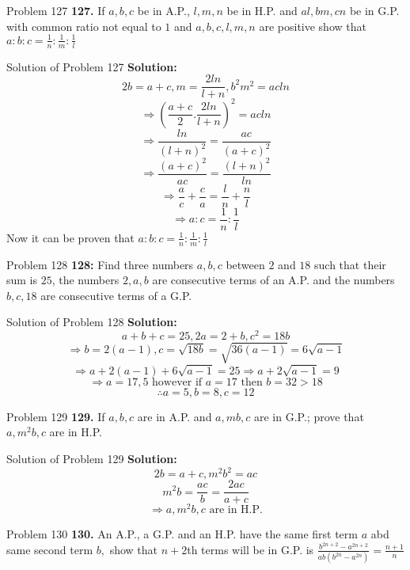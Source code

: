 \documentclass[aspectratio=1610,8pt]{beamer}
\begin{document}
\begin{frame}{Problem 127}
  \textbf{127.} If $a, b, c$ be in A.P., $l, m, n$ be in H.P. and $al, bm, cn$ be in G.P. with common ratio not equal to $1$ and
  $a, b, c, l, m, n$ are positive show that $a:b:c = \frac{1}{n}:\frac{1}{m}:\frac{1}{l}$
\end{frame}
\begin{frame}{Solution of Problem 127}
  \textbf{Solution:} $$2b = a + c, m = \frac{2ln}{l + n}, b^2m^2 = acln$$
  $$\Rightarrow \left(\frac{a + c}{2}.\frac{2ln}{l + n}\right)^2 = acln$$
  $$\Rightarrow \frac{ln}{(l + n)^2} = \frac{ac}{(a + c)^2}$$
  $$\Rightarrow \frac{(a + c)^2}{ac} = \frac{(l + n)^2}{ln}$$
  $$\Rightarrow \frac{a}{c} + \frac{c}{a} = \frac{l}{n} + \frac{n}{l}$$
  $$\Rightarrow a:c = \frac{1}{n}:\frac{1}{l}$$
  Now it can be proven that $a:b:c = \frac{1}{n}:\frac{1}{m}:\frac{1}{l}$
\end{frame}
\begin{frame}{Problem 128}
  \textbf{128:} Find three numbers $a, b, c$ between $2$ and $18$ such that their sum is $25$, the numbers $2, a, b$ are
  consecutive terms of an A.P. and the numbers $b, c, 18$ are consecutive terms of a G.P.
\end{frame}
\begin{frame}{Solution of Problem 128}
  \textbf{Solution:} $$a + b + c = 25, 2a = 2 + b, c^2 = 18b$$
  $$\Rightarrow b = 2(a - 1), c = \sqrt{18b} = \sqrt{36(a - 1)} = 6\sqrt{a - 1}$$
  $$\Rightarrow a + 2(a - 1) + 6\sqrt{a - 1} = 25\Rightarrow a + 2\sqrt{a - 1} = 9$$
  $$\Rightarrow a = 17, 5 \text{~however if~}a = 17\text{~then~}b = 32 > 18$$
  $$\therefore a = 5, b = 8, c = 12$$
\end{frame}
\begin{frame}{Problem 129}
  \textbf{129.} If $a, b, c$ are in A.P. and $a, mb, c$ are in G.P.; prove that $a, m^2b, c$ are in H.P.
\end{frame}
\begin{frame}{Solution of Problem 129}
  \textbf{Solution:} $$2b = a + c, m^2b^2 = ac$$
  $$m^2b = \frac{ac}{b} = \frac{2ac}{a + c}$$
  $$\Rightarrow a, m^2b, c\text{~are in H.P.}$$
\end{frame}
\begin{frame}{Problem 130}
  \textbf{130.} An A.P., a G.P. and an H.P. have the same first term $a$ abd same second term $b,$ show that $n + 2$th terms will
  be in G.P. is $\frac{b^{2n + 2} - a^{2n + 2}}{ab(b^{2n} - a^{2n})} = \frac{n + 1}{n}$
\end{frame}
\end{document}
